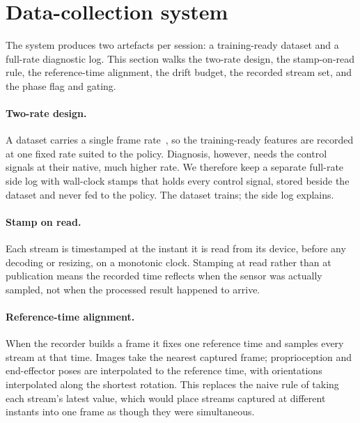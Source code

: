 \section{Data-collection system}
\label{sec:collection}

The system produces two artefacts per session: a training-ready dataset and
a full-rate diagnostic log. This section walks the two-rate design, the
stamp-on-read rule, the reference-time alignment, the drift budget, the
recorded stream set, and the phase flag and gating.

\paragraph{Two-rate design.} A dataset carries a single frame
rate~\citep{lerobot}, so the training-ready features are recorded at one
fixed rate suited to the policy. Diagnosis, however, needs the control signals at their native, much
higher rate. We therefore keep a separate full-rate side log with
wall-clock stamps that holds every control signal, stored beside the
dataset and never fed to the policy. The dataset trains; the side log
explains.

\paragraph{Stamp on read.} Each stream is timestamped at the instant it is
read from its device, before any decoding or resizing, on a monotonic
clock. Stamping at read rather than at publication means the recorded time
reflects when the sensor was actually sampled, not when the processed
result happened to arrive.

\paragraph{Reference-time alignment.} When the recorder builds a frame it
fixes one reference time and samples every stream at that time. Images take
the nearest captured frame; proprioception and end-effector poses are
interpolated to the reference time, with orientations interpolated along
the shortest rotation. This replaces the naive rule of taking each stream's
latest value, which would place streams captured at different instants into
one frame as though they were simultaneous.

